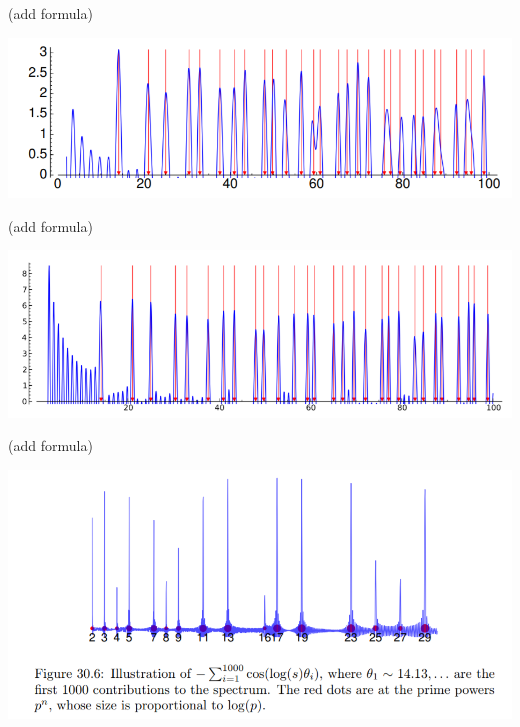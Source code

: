 \documentclass{beamer}
\begin{document}
\begin{frame}{}

(add formula)

\includegraphics[height=.41\textheight]{pics/prime-power-freq-20.png}

\end{frame}


\begin{frame}{}

(add formula)

\includegraphics[height=.43\textheight]{pics/prime-power-freq-500.png}

\end{frame}


\begin{frame}{}

(add formula)

\includegraphics[height=.65\textheight]{pics/zeros-series-1000.png}

\end{frame}
\end{document}
